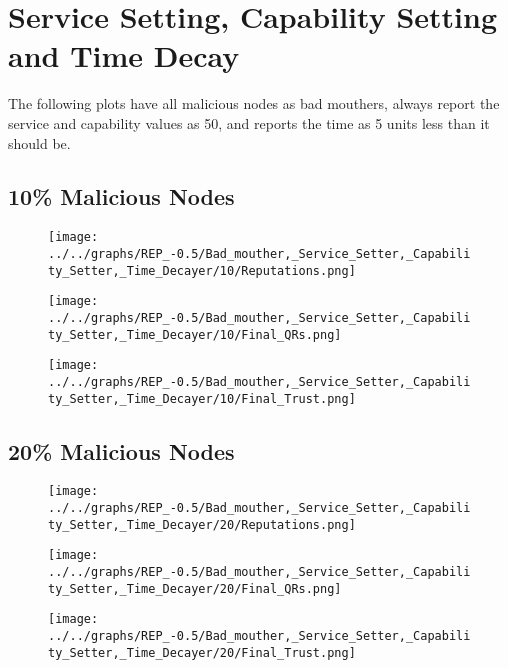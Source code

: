 \section*{Service Setting, Capability Setting and Time Decay}
The following plots have all malicious nodes as bad mouthers, always
report the service and capability values as 50, and reports the time as
5 units less than it should be.
\\
\begin{minipage}[t]{0.49\columnwidth}
\subsection*{10\% Malicious Nodes}
    \begin{figure}[H]
        \centering
        \texttt{[image: ../../graphs/REP\_-0.5/Bad\_mouther,\_Service\_Setter,\_Capability\_Setter,\_Time\_Decayer/10/Reputations.png]}
    \end{figure}
    \begin{figure}[H]
        \centering
        \texttt{[image: ../../graphs/REP\_-0.5/Bad\_mouther,\_Service\_Setter,\_Capability\_Setter,\_Time\_Decayer/10/Final\_QRs.png]}
    \end{figure}
\end{minipage}
\begin{minipage}[t]{0.49\columnwidth}
    \begin{figure}[H]
        \centering
        \texttt{[image: ../../graphs/REP\_-0.5/Bad\_mouther,\_Service\_Setter,\_Capability\_Setter,\_Time\_Decayer/10/Final\_Trust.png]}
    \end{figure}
\end{minipage}

\begin{minipage}[t]{0.49\columnwidth}
\subsection*{20\% Malicious Nodes}
    \begin{figure}[H]
        \centering
        \texttt{[image: ../../graphs/REP\_-0.5/Bad\_mouther,\_Service\_Setter,\_Capability\_Setter,\_Time\_Decayer/20/Reputations.png]}
    \end{figure}
    \begin{figure}[H]
        \centering
        \texttt{[image: ../../graphs/REP\_-0.5/Bad\_mouther,\_Service\_Setter,\_Capability\_Setter,\_Time\_Decayer/20/Final\_QRs.png]}
    \end{figure}
\end{minipage}
\begin{minipage}[t]{0.49\columnwidth}
    \begin{figure}[H]
        \centering
        \texttt{[image: ../../graphs/REP\_-0.5/Bad\_mouther,\_Service\_Setter,\_Capability\_Setter,\_Time\_Decayer/20/Final\_Trust.png]}
    \end{figure}
\end{minipage}

